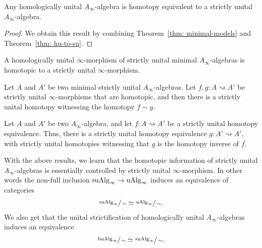 \documentclass[../thesis.tex]{subfiles}
\begin{document}
            \begin{corollary}\label{cor: unit-strict-alg}
                Any homologically unital $A_\infty$-algebra is homotopy equivalent to a strictly unital $A_\infty$-algebra.
            \end{corollary}

            \begin{proof}
                We obtain this result by combining Theorem~\ref{thm: minimal-models} and Theorem~\ref{thm: hu-to-su}.
            \end{proof}

            \begin{thm}
                A homologically unital $\infty$-morphism of strictly unital minimal $A_\infty$-algebras is homotopic to a strictly unital $\infty$-morphism.
            \end{thm}

            \begin{thm}
                Let $A$ and $A'$ be two minimal strictly unital $A_\infty$-algebras. Let $f,g: A \rightsquigarrow A'$ be strictly unital $\infty$-morphisms that are homotopic, and then there is a strictly unital homotopy witnessing the homotopy $f \sim g$.
            \end{thm}

            \begin{corollary}
                Let $A$ and $A'$ be two $A_\infty$-algebra, and let $f: A \rightsquigarrow A'$ be a strictly unital homotopy equivalence. Thus, there is a strictly unital homotopy equivalence $g: A' \rightsquigarrow A'$, with strictly unital homotopies witnessing that $g$ is the homotopy inverse of $f$.
            \end{corollary}

            With the above results, we learn that the homotopic information of strictly unital $A_\infty$-algebras is essentially controlled by strictly unital $\infty$-morphism. In other words the non-full inclusion $\tt{suAlg}_\infty \rightarrow \tt{uAlg}_\infty$ induces an equivalence of categories
            \begin{align*}
                \sfrac{\tt{suAlg}_\infty}{\sim} \simeq \sfrac{\tt{uAlg}_\infty}{\sim}\tt{.}
            \end{align*}
            We also get that the unital strictification of homologically unital $A_\infty$-algebras induces an equivalence
            \begin{align*}
                \sfrac{\tt{huAlg}_\infty}{\sim} \simeq \sfrac{\tt{suAlg}_\infty}{\sim}\tt{.}
            \end{align*}
\end{document}
